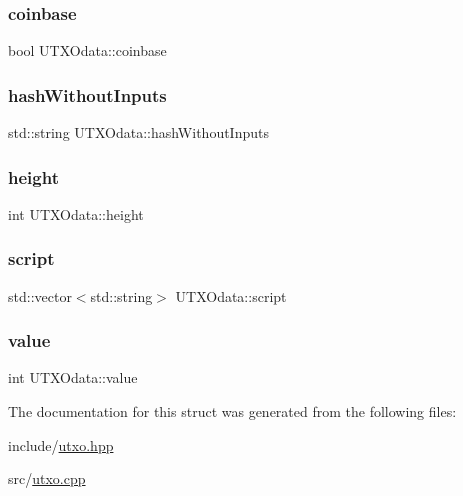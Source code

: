 \subsubsection{\texorpdfstring{coinbase}{coinbase}}
{\footnotesize\ttfamily bool U\+T\+X\+Odata\+::coinbase}

\mbox{\label{structUTXOdata_ae2bfbc7be65eb1c5583084572818ddb2}} 
\subsubsection{\texorpdfstring{hash\+Without\+Inputs}{hashWithoutInputs}}
{\footnotesize\ttfamily std\+::string U\+T\+X\+Odata\+::hash\+Without\+Inputs}

\mbox{\label{structUTXOdata_ac437a55d55e7d7de1bd2558fefccc541}} 
\subsubsection{\texorpdfstring{height}{height}}
{\footnotesize\ttfamily int U\+T\+X\+Odata\+::height}

\mbox{\label{structUTXOdata_a9195f06da49760fd982965b008f906c2}} 
\subsubsection{\texorpdfstring{script}{script}}
{\footnotesize\ttfamily std\+::vector$<$std\+::string$>$ U\+T\+X\+Odata\+::script}

\mbox{\label{structUTXOdata_a255dc301eba5d915c6a5dc752ec11a86}} 
\subsubsection{\texorpdfstring{value}{value}}
{\footnotesize\ttfamily int U\+T\+X\+Odata\+::value}



The documentation for this struct was generated from the following files\+:\begin{DoxyCompactItemize}
\item 
include/\mbox{\hyperlink{utxo_8hpp}{utxo.\+hpp}}\item 
src/\mbox{\hyperlink{utxo_8cpp}{utxo.\+cpp}}\end{DoxyCompactItemize}
